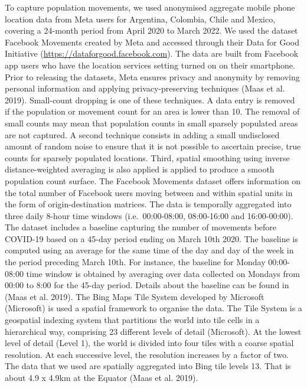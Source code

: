 \documentclass[
  11pt,
]{article}
\begin{document}
To capture population movements, we used anonymised aggregate mobile
phone location data from Meta users for Argentina, Colombia, Chile and
Mexico, covering a 24-month period from April 2020 to March 2022. We
used the dataset Facebook Movements created by Meta and accessed through
their Data for Good Initiative (\url{https://dataforgood.facebook.com}).
The data are built from Facebook app users who have the location
services setting turned on on their smartphone. Prior to releasing the
datasets, Meta ensures privacy and anonymity by removing personal
information and applying privacy-preserving techniques (Maas et al.
2019). Small-count dropping is one of these techniques. A data entry is
removed if the population or movement count for an area is lower than
10. The removal of small counts may mean that population counts in small
sparsely populated areas are not captured. A second technique consists
in adding a small undisclosed amount of random noise to ensure that it
is not possible to ascertain precise, true counts for sparsely populated
locations. Third, spatial smoothing using inverse distance-weighted
averaging is also applied is applied to produce a smooth population
count surface. The Facebook Movements dataset offers information on the
total number of Facebook users moving between and within spatial units
in the form of origin-destination matrices. The data is temporally
aggregated into three daily 8-hour time windows (i.e.~00:00-08:00,
08:00-16:00 and 16:00-00:00). The dataset includes a baseline capturing
the number of movements before COVID-19 based on a 45-day period ending
on March 10th 2020. The baseline is computed using an average for the
same time of the day and day of the week in the period preceding March
10th. For instance, the baseline for Monday 00:00-08:00 time window is
obtained by averaging over data collected on Mondays from 00:00 to 8:00
for the 45-day period. Details about the baseline can be found in (Maas
et al. 2019). The Bing Maps Tile System developed by Microsoft
(Microsoft) is used a spatial framework to organise the data. The Tile
System is a geospatial indexing system that partitions the world into
tile cells in a hierarchical way, comprising 23 different levels of
detail (Microsoft). At the lowest level of detail (Level 1), the world
is divided into four tiles with a coarse spatial resolution. At each
successive level, the resolution increases by a factor of two. The data
that we used are spatially aggregated into Bing tile levels 13. That is
about 4.9 x 4.9km at the Equator (Maas et al. 2019).
\end{document}
